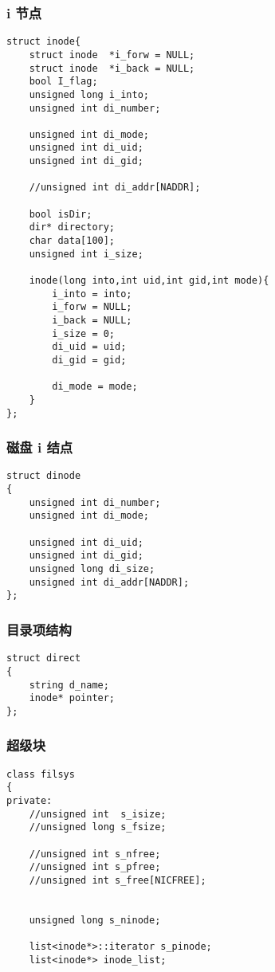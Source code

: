 \documentclass{article}
\begin{document}
\begin{CJK}{UTF8}{gkai}
\subsubsection{i 节点}
\begin{lstlisting}
struct inode{
	struct inode  *i_forw = NULL;
	struct inode  *i_back = NULL;
	bool I_flag;
	unsigned long i_into;    
	unsigned int di_number; 

	unsigned int di_mode; 
	unsigned int di_uid;  
	unsigned int di_gid;  

	//unsigned int di_addr[NADDR];    

	bool isDir;
	dir* directory;
	char data[100];
	unsigned int i_size;

	inode(long into,int uid,int gid,int mode){
		i_into = into;
		i_forw = NULL;
		i_back = NULL;
		i_size = 0;
		di_uid = uid;
		di_gid = gid;

		di_mode = mode;
	}
};
\end{lstlisting}

\subsubsection{磁盘 i 结点}
\begin{lstlisting}
struct dinode
{
	unsigned int di_number;    
	unsigned int di_mode;   

	unsigned int di_uid;
	unsigned int di_gid;
	unsigned long di_size;    
	unsigned int di_addr[NADDR];
};
\end{lstlisting}

\subsubsection{目录项结构}
\begin{lstlisting}
struct direct
{
	string d_name;     
	inode* pointer;   
};
\end{lstlisting}
\subsubsection{超级块}
\begin{lstlisting}
class filsys
{
private:
	//unsigned int  s_isize;  
	//unsigned long s_fsize;    

	//unsigned int s_nfree;    
	//unsigned int s_pfree;   
	//unsigned int s_free[NICFREE]; 


	unsigned long s_ninode;       

	list<inode*>::iterator s_pinode;    
	list<inode*> inode_list;


\end{lstlisting}
\end{CJK}
\end{document}
